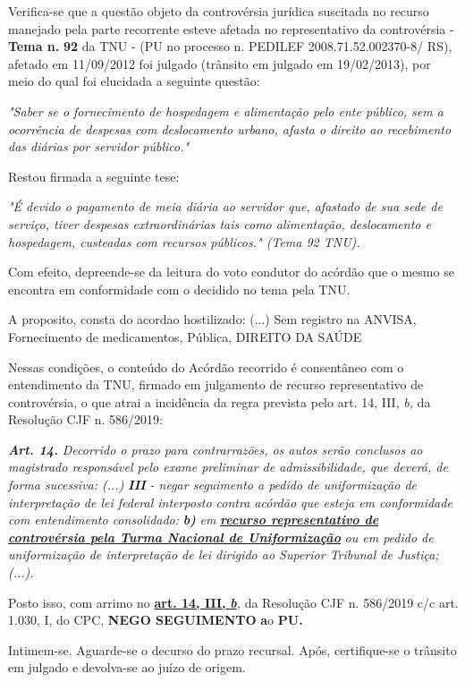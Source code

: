 \documentclass[12pt]{article}
\begin{document}
\justifying
\noindent Verifica-se que a questão objeto da controvérsia jurídica suscitada no recurso manejado pela parte recorrente esteve afetada no representativo da controvérsia - \textbf{Tema n. }\textbf{92} da TNU - (PU no processo n. PEDILEF 2008.71.52.002370-8/ RS),  afetado em 11/09/2012 foi julgado (trânsito em julgado em 19/02/2013), por meio do qual foi elucidada a seguinte questão:

\noindent \textit{"Saber se o fornecimento de hospedagem e alimentação pelo ente público, sem a ocorrência de despesas com deslocamento urbano, afasta o direito ao recebimento das diárias por servidor público."}

\noindent Restou firmada a seguinte tese:

\noindent \textit{"É devido o pagamento de meia diária ao servidor que, afastado de sua sede de serviço, tiver despesas extraordinárias tais como alimentação, deslocamento e hospedagem, custeadas com recursos públicos." (Tema 92 TNU).}

\noindent Com efeito, depreende-se da leitura do voto condutor do acórdão que o mesmo se encontra em conformidade com o decidido no  tema pela TNU.

\noindent A proposito, consta do acordao hostilizado: (...) Sem registro na ANVISA, Fornecimento de medicamentos, Pública, DIREITO DA SAÚDE

\noindent Nessas condições, o conteúdo do Acórdão recorrido é consentâneo com o entendimento da TNU, firmado em julgamento de recurso representativo de controvérsia, o que atrai a incidência da regra prevista pelo art. 14, III, \textit{b,} da Resolução CJF n. 586/2019:

\noindent \textit{\textbf{Art. 14.}}\textit{ Decorrido o prazo para contrarrazões, os autos serão conclusos ao magistrado responsável pelo exame preliminar de admissibilidade, que deverá, de forma sucessiva: (...) }\textit{\textbf{III }}\textit{- negar seguimento a pedido de uniformização de interpretação de lei federal interposto contra acórdão que esteja em conformidade com entendimento consolidado: }\textit{\textbf{b)}}\textit{ em }\uline{\textit{\textbf{recurso representativo de controvérsia pela Turma Nacional de Uniformização}}}\textit{ ou em pedido de uniformização de interpretação de lei dirigido ao Superior Tribunal de Justiça;(...).}

\noindent Posto isso, com arrimo no \uline{\textbf{art. 14, III, }}\uline{\textit{\textbf{b}}}\textit{,} da Resolução CJF n. 586/2019 c/c art. 1.030, I, do CPC, \textbf{NEGO SEGUIMENTO }\textbf{a}o\textbf{ PU}\textbf{.}

\noindent Intimem-se. Aguarde-se o decurso do prazo recursal. Após, certifique-se o trânsito em julgado e devolva-se ao juízo de origem.
\end{document}
